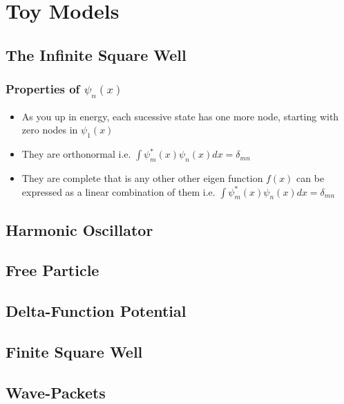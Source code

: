 \chapter{Toy Models}
\section{The Infinite Square Well}
\subsection{Properties of $\psi_{n}(x)$}
\begin{itemize}
\item As you up in energy, each sucessive state has one more node, starting with zero nodes in $\psi_{1}(x)$
\item They are orthonormal i.e. $\int \psi^{*}_{m}(x) \psi_{n}(x) dx = \delta_{mn}$
\item They are complete that is any other other eigen function $f(x)$ can be expressed as a linear combination of them i.e. $\int \psi^{*}_{m}(x) \psi_{n}(x) dx = \delta_{mn}$
\end{itemize}
\section{Harmonic Oscillator}
\section{Free Particle}
\section{Delta-Function Potential}
\section{Finite Square Well}
\section{Wave-Packets}